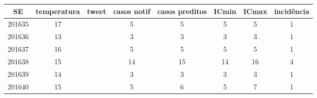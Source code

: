 \begin{tabular}{c|ccccccc}
  \hline
SE & temperatura & tweet & casos notif & casos preditos & ICmin & ICmax & incidência \\ 
  \hline
201635 & 17 &  & 5 & 5 & 5 & 5 & 1 \\ 
  201636 & 13 &  & 3 & 3 & 3 & 3 & 1 \\ 
  201637 & 16 &  & 5 & 5 & 5 & 5 & 1 \\ 
  201638 & 15 &  & 14 & 15 & 14 & 16 & 4 \\ 
  201639 & 14 &  & 3 & 3 & 3 & 3 & 1 \\ 
  201640 & 15 &  & 5 & 6 & 5 & 7 & 1 \\ 
   \hline
\end{tabular}
